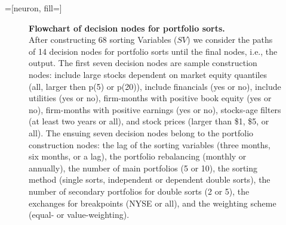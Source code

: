 
\makeatletter
 {\def\nnlayercolor{#1}}
\xpatchcmd{\linklayers}{\nn@lastnode}{\lastnode}{}{}
\xpatchcmd{\linklayers}{\nn@thisnode}{\thisnode}{}{}
\makeatother

=[neuron, fill=\nnlayercolor]
\newcommand{\hiddenlayercolor}[1][] { \layer[bias=true,nodeclass={hiddencl},#1] }
\newcommand{\outputlayercolor}[1][] { \layer[bias=true,nodeclass={output neuron},#1] }

\begin{landscape}
\begin{figure}[ht]
	\caption{\small {\bfseries Flowchart of decision nodes for portfolio sorts.} \\
    \footnotesize
    After constructing 68 sorting Variables ($SV$) we consider the paths of 14 decision nodes for portfolio sorts until the final nodes, i.e., the output. The first seven decision nodes are sample construction nodes: include large stocks dependent on market equity quantiles (all, larger then p(5) or p(20)), include financials (yes or no), include utilities (yes or no), firm-months with positive book equity (yes or no), firm-months with positive earnings (yes or no), stocks-age filters (at least two years or all), and stock prices (larger than \$1, \$5, or all). The ensuing seven decision nodes belong to the portfolio construction nodes: the lag of the sorting variables (three months, six months, or a \cite{fa/fr/1992} lag), the portfolio rebalancing (monthly or annually), the number of main portfolios (5 or 10), the sorting method (single sorts, independent or dependent double sorts), the number of secondary portfolios for double sorts (2 or 5), the exchanges for breakpoints (NYSE or all), and the weighting scheme (equal- or value-weighting).\\[-8px]}
    \label{fig:decision_nodes}
    \centering

    \begin{footnotesize}
		

\end{footnotesize}
\end{figure}
\end{landscape}
